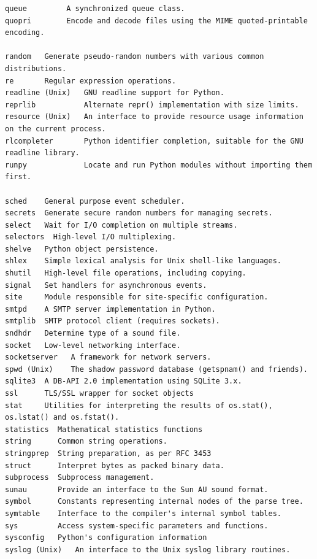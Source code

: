 \documentclass[9pt,a4wide]{extarticle}
\begin{document}
\begin{verbatim}
queue         A synchronized queue class.
quopri        Encode and decode files using the MIME quoted-printable encoding.

random   Generate pseudo-random numbers with various common distributions.
re       Regular expression operations.
readline (Unix)   GNU readline support for Python.
reprlib           Alternate repr() implementation with size limits.
resource (Unix)   An interface to provide resource usage information on the current process.
rlcompleter       Python identifier completion, suitable for the GNU readline library.
runpy             Locate and run Python modules without importing them first.

sched    General purpose event scheduler.
secrets  Generate secure random numbers for managing secrets.
select   Wait for I/O completion on multiple streams.
selectors  High-level I/O multiplexing.
shelve   Python object persistence.
shlex    Simple lexical analysis for Unix shell-like languages.
shutil   High-level file operations, including copying.
signal   Set handlers for asynchronous events.
site     Module responsible for site-specific configuration.
smtpd    A SMTP server implementation in Python.
smtplib  SMTP protocol client (requires sockets).
sndhdr   Determine type of a sound file.
socket   Low-level networking interface.
socketserver   A framework for network servers.
spwd (Unix)    The shadow password database (getspnam() and friends).
sqlite3  A DB-API 2.0 implementation using SQLite 3.x.
ssl      TLS/SSL wrapper for socket objects
stat     Utilities for interpreting the results of os.stat(), os.lstat() and os.fstat().
statistics  Mathematical statistics functions
string      Common string operations.
stringprep  String preparation, as per RFC 3453
struct      Interpret bytes as packed binary data.
subprocess  Subprocess management.
sunau       Provide an interface to the Sun AU sound format.
symbol      Constants representing internal nodes of the parse tree.
symtable    Interface to the compiler's internal symbol tables.
sys         Access system-specific parameters and functions.
sysconfig   Python's configuration information
syslog (Unix)   An interface to the Unix syslog library routines.


\end{verbatim}
\end{document}
